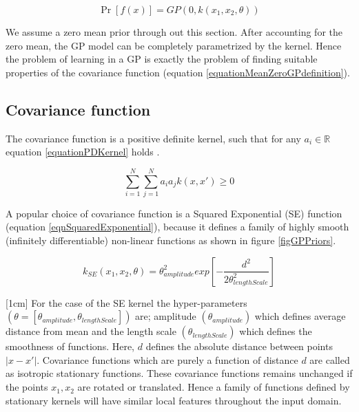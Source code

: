 \begin{equation}\label{equationMeanZeroGPdefinition}
\Pr[f(x)] = GP(0 , k(x_{1}, x_{2}, \theta))
\end{equation}

We assume a zero mean prior through out this section. After accounting for the zero mean, the GP model can be completely parametrized by the kernel. Hence the problem of learning in a GP is exactly the problem of finding suitable properties of the covariance function \cite{rasmussen2006gaussian} (equation \ref{equationMeanZeroGPdefinition}). 


\subsection{Covariance function}\label{subSecCH2Covariance}
The covariance function is a positive definite kernel, such that for any $a_{i} \in \mathbb{R}$ equation \ref{equationPDKernel} holds \cite{Stein1999Springer}.

\begin{equation}\label{equationPDKernel}
\sum_{i=1}^{N}\sum_{j=1}^{N}a_{i}a_{j}k(x,x') \geq 0
\end{equation}

A popular choice of covariance function is a Squared Exponential (SE) function (equation \ref{eqnSquaredExponential}), because it defines a family of highly smooth (infinitely differentiable) non-linear functions as shown in figure \ref{figGPPriors}.

\begin{equation}\label{eqnSquaredExponential}
k_{SE}(x_{1}, x_{2}, \theta) = \theta_{amplitude}^2exp[-\frac{d^2}{2\theta_{lengthScale}^2}]
\end{equation}

[1cm]
For the case of the SE kernel the hyper-parameters $(\theta = [\theta_{amplitude}, \theta_{lengthScale}])$ are; amplitude $(\theta_{amplitude})$ which defines average distance from mean and the length scale $(\theta_{lengthScale})$ which defines the smoothness of functions. Here, $d$ defines the absolute distance between points $|x-x'|$. Covariance functions which are purely a function of distance $d$ are called as isotropic stationary functions. These covariance functions remains unchanged if the points $x_{1}, x_{2}$ are rotated or translated. Hence a family of functions defined by stationary kernels will have similar local features throughout the input domain. 

